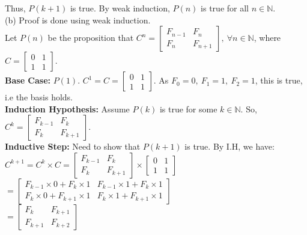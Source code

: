 \documentclass[a4paper]{article}
\begin{document}
\begin{enumerate}
Thus, $P(k+1)$ is true. By weak induction, $P(n)$ is true for all $n \in \mathbb{N}$.\\

(b) Proof is done using weak induction.\\
Let $P(n)$ be the proposition that $C^n = \begin{bmatrix}F_{n-1} & F_n\\F_n & F_{n+1}\end{bmatrix},\ \forall n \in \mathbb{N}$, where $C = \begin{bmatrix}0 & 1\\1 & 1\end{bmatrix}$.\\

\textbf{Base Case:} $P(1)$. $C^1 = C = \begin{bmatrix}0 & 1\\1 & 1\end{bmatrix}$. As $F_0 = 0,\ F_1 = 1,\ F_2 = 1$, this is true, i.e the basis holds.\\

\textbf{Induction Hypothesis:} Assume $P(k)$ is true for some $k \in \mathbb{N}$. So, $C^k = \begin{bmatrix}F_{k-1} & F_k\\F_k & F_{k+1}\end{bmatrix}$.\\

\textbf{Inductive Step:} Need to show that $P(k+1)$ is true. By I.H, we have:\\
$C^{k+1} = C^k \times C = \begin{bmatrix}F_{k-1} & F_k\\F_k & F_{k+1}\end{bmatrix} \times \begin{bmatrix}0 & 1\\1 & 1\end{bmatrix}$
\\
$= \begin{bmatrix}
    F_{k-1} \times 0 + F_k \times 1 & F_{k-1} \times 1 + F_k \times 1\\
    F_k \times 0 + F_{k+1} \times 1 & F_k \times 1 + F_{k+1} \times 1
\end{bmatrix}$\\

$= \begin{bmatrix}
    F_k & F_{k+1}\\
    F_{k+1} & F_{k+2}
\end{bmatrix}$


\end{enumerate}
\end{document}
